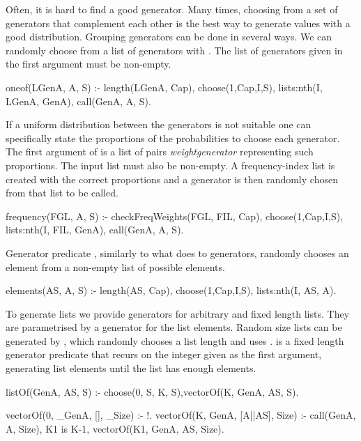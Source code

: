 Often, it is hard to find a good generator.
%
Many times, choosing from a set of generators that complement each other
is the best way to generate values with a good distribution.
%
Grouping generators can be done in several ways.
%
We can randomly choose from a list of generators with .
%
The list of generators given in the first argument must be non-empty.
%
\begin{yapcode}
 oneof(LGenA, A, S) :- length(LGenA, Cap), choose(1,Cap,I,S),
   lists:nth(I, LGenA, GenA), call(GenA, A, S).
\end{yapcode}
%
If a uniform distribution between the generators is not suitable one can
specifically state the proportions of the probabilities to choose each
generator.
%
The first argument of  is a list of pairs
\yap{\{}\emph{weight}\yap{,}\emph{generator}\yap{\}} representing such
proportions.
%
The input list must also be non-empty.
%
A frequency-index list is created with the correct proportions and a
generator is then randomly chosen from that list to be called.
\begin{yapcode}
 frequency(FGL, A, S) :- checkFreqWeights(FGL, FIL, Cap),
   choose(1,Cap,I,S), lists:nth(I, FIL, GenA), call(GenA, A, S).
\end{yapcode}




Generator predicate , similarly to what
 does to generators, randomly chooses an element%
from a non-empty list of possible elements.
%
\begin{yapcode}
 elements(AS, A, S) :-
   length(AS, Cap), choose(1,Cap,I,S), lists:nth(I, AS, A).
\end{yapcode}



To generate lists we provide generators for arbitrary and
fixed length lists.
%
They are %
parametrised by a generator for the list elements.
%
Random size lists can be generated by , which randomly
chooses a list length and uses . 
%
 is a fixed length generator predicate that recurs on
the integer given as the first argument, generating
list elements until the list has enough elements.
\begin{yapcode}
 listOf(GenA, AS, S) :- choose(0, S, K, S),vectorOf(K, GenA, AS, S).

 vectorOf(0, _GenA, [], _Size) :- !.
 vectorOf(K, GenA, [A||AS], Size) :-
   call(GenA, A, Size), K1 is K-1, vectorOf(K1, GenA, AS, Size).
\end{yapcode}


